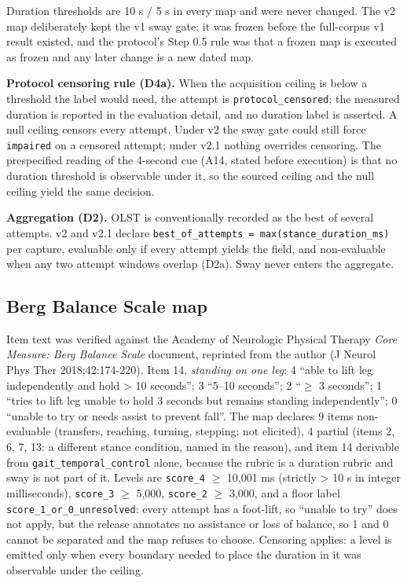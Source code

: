 \documentclass[11pt]{article}
\begin{document}
Duration thresholds are 10 s / 5 s in every map and were never changed. The v2 map deliberately kept the v1 sway gate: it was frozen before the full-corpus v1 result existed, and the protocol's Step 0.5 rule was that a frozen map is executed as frozen and any later change is a new dated map.

\textbf{Protocol censoring rule (D4a).} When the acquisition ceiling is below a threshold the label would need, the attempt is \texttt{protocol\_censored}; the measured duration is reported in the evaluation detail, and no duration label is asserted. A null ceiling censors every attempt. Under v2 the sway gate could still force \texttt{impaired} on a censored attempt; under v2.1 nothing overrides censoring. The prespecified reading of the 4-second cue (A14, stated before execution) is that no duration threshold is observable under it, so the sourced ceiling and the null ceiling yield the same decision.

\textbf{Aggregation (D2).} OLST is conventionally recorded as the best of several attempts. v2 and v2.1 declare \texttt{best\_of\_attempts\ =\ max(stance\_duration\_ms)} per capture, evaluable only if every attempt yields the field, and non-evaluable when any two attempt windows overlap (D2a). Sway never enters the aggregate.

\subsection{Berg Balance Scale map}\label{berg-balance-scale-map}

Item text was verified against the Academy of Neurologic Physical Therapy \emph{Core Measure: Berg Balance Scale} document, reprinted from the author (J Neurol Phys Ther 2018;42:174-220). Item 14, \emph{standing on one leg}: 4 ``able to lift leg independently and hold \textgreater{} 10 seconds''; 3 ``5--10 seconds''; 2 ``$\geq$ 3 seconds''; 1 ``tries to lift leg unable to hold 3 seconds but remains standing independently''; 0 ``unable to try or needs assist to prevent fall''. The map declares 9 items non-evaluable (transfers, reaching, turning, stepping: not elicited), 4 partial (items 2, 6, 7, 13: a different stance condition, named in the reason), and item 14 derivable from \texttt{gait\_temporal\_control} alone, because the rubric is a duration rubric and sway is not part of it. Levels are \texttt{score\_4} $\geq$ 10,001 ms (strictly \textgreater{} 10 s in integer milliseconds), \texttt{score\_3} $\geq$ 5,000, \texttt{score\_2} $\geq$ 3,000, and a floor label \texttt{score\_1\_or\_0\_unresolved}: every attempt has a foot-lift, so ``unable to try'' does not apply, but the release annotates no assistance or loss of balance, so 1 and 0 cannot be separated and the map refuses to choose. Censoring applies: a level is emitted only when every boundary needed to place the duration in it was observable under the ceiling.
\end{document}
